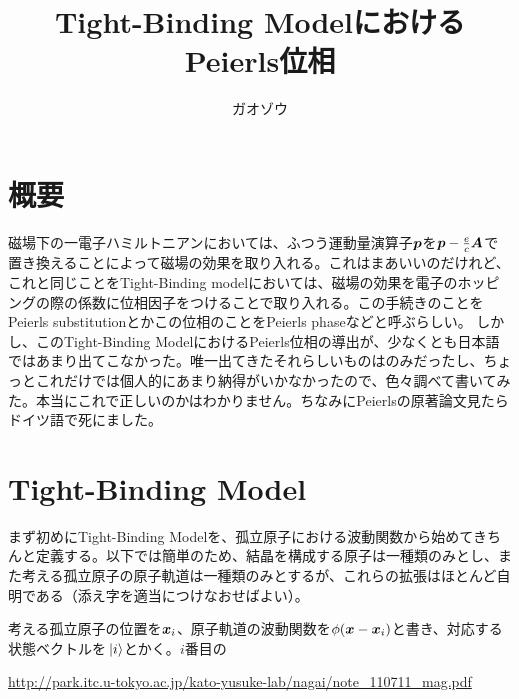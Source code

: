 \documentclass[uplatex,dvipdfmx, a4j]{jsarticle}
\title{Tight-Binding ModelにおけるPeierls位相}
\author{ガオゾウ}
\begin{document}
\maketitle
\section{概要}
磁場下の一電子ハミルトニアンにおいては、ふつう運動量演算子$\vb*{p}$を$\vb*{p}-\frac{e}{c}\vb*{A}$で置き換えることによって磁場の効果を取り入れる。これはまあいいのだけれど、これと同じことをTight-Binding modelにおいては、磁場の効果を電子のホッピングの際の係数に位相因子をつけることで取り入れる。この手続きのことをPeierls substitutionとかこの位相のことをPeierls phaseなどと呼ぶらしい。
しかし、このTight-Binding ModelにおけるPeierls位相の導出が、少なくとも日本語ではあまり出てこなかった。唯一出てきたそれらしいものは\cite{NagaiNote}のみだったし、ちょっとこれだけでは個人的にあまり納得がいかなかったので、色々調べて書いてみた。本当にこれで正しいのかはわかりません。ちなみにPeierlsの原著論文見たらドイツ語で死にました。

\section{Tight-Binding Model}
まず初めにTight-Binding Modelを、孤立原子における波動関数から始めてきちんと定義する。以下では簡単のため、結晶を構成する原子は一種類のみとし、また考える孤立原子の原子軌道は一種類のみとするが、これらの拡張はほとんど自明である（添え字を適当につけなおせばよい）。

考える孤立原子の位置を$\vb*{x}_i$、原子軌道の波動関数を$\phi(\vb*{x}-\vb*{x}_i)$と書き、対応する状態ベクトルを$\ket*{i}$とかく。$i$番目の







\begin{thebibliography}{99}
	 \url{http://park.itc.u-tokyo.ac.jp/kato-yusuke-lab/nagai/note_110711_mag.pdf}
\end{thebibliography}
\end{document}
